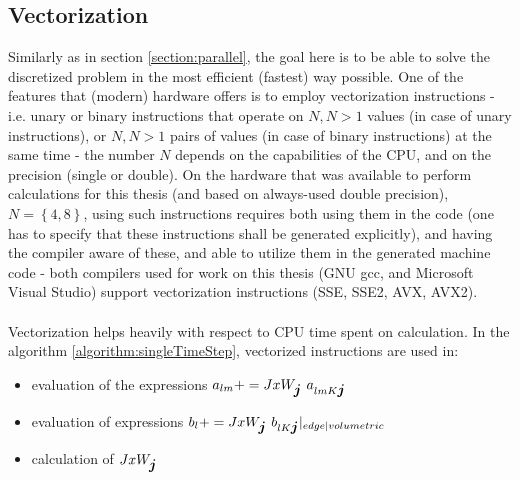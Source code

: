 \subsection{Vectorization}
Similarly as in section \ref{section:parallel}, the goal here is to be able to solve the discretized problem in the most efficient (fastest) way possible. One of the features that (modern) hardware offers is to employ vectorization instructions - i.e. unary or binary instructions that operate on $N, N > 1$ values (in case of unary instructions), or $N, N > 1$ pairs of values (in case of binary instructions) at the same time - the number $N$ depends on the capabilities of the CPU, and on the precision (single or double). On the hardware that was available to perform calculations for this thesis (and based on always-used double precision), $N = \left\{4, 8\right\}$, using such instructions requires both using them in the code (one has to specify that these instructions shall be generated explicitly), and having the compiler aware of these, and able to utilize them in the generated machine code - both compilers used for work on this thesis (GNU gcc, and Microsoft Visual Studio) support vectorization instructions (SSE, SSE2, AVX, AVX2).
\paragraph{}
Vectorization helps heavily with respect to CPU time spent on calculation. In the algorithm \ref{algorithm:singleTimeStep}, vectorized instructions are used in:
\begin{itemize}
    \item evaluation of the expressions $a_{lm} += JxW_{\mbox{\boldmath $j$}} \ a_{lm K \mbox{\boldmath $j$}}$
    \item evaluation of expressions $b_{l} += JxW_{\mbox{\boldmath $j$}} \ b_{l K \mbox{\boldmath $j$}}|_{edge|volumetric}$
    \item calculation of $JxW_{\mbox{\boldmath $j$}}$
\end{itemize}